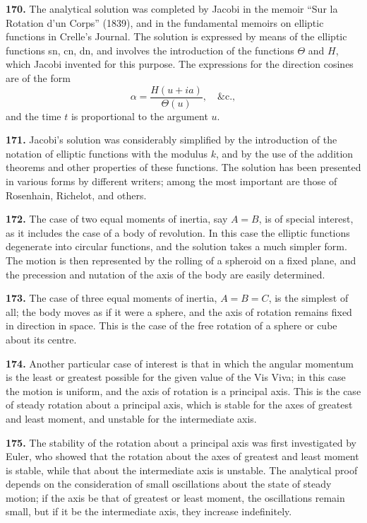 \documentclass[11pt,a4paper]{book}
\begin{document}
\textbf{170.} The analytical solution was completed by Jacobi in the memoir ``Sur la Rotation d'un Corps'' (1839), and in the fundamental memoirs on elliptic functions in Crelle's Journal. The solution is expressed by means of the elliptic functions sn, cn, dn, and involves the introduction of the functions $\Theta$ and $H$, which Jacobi invented for this purpose. The expressions for the direction cosines are of the form
\[
\alpha = \frac{H(u + ia)}{\Theta(u)}, \quad \&\text{c.},
\]
and the time $t$ is proportional to the argument $u$.

\textbf{171.} Jacobi's solution was considerably simplified by the introduction of the notation of elliptic functions with the modulus $k$, and by the use of the addition theorems and other properties of these functions. The solution has been presented in various forms by different writers; among the most important are those of Rosenhain, Richelot, and others.

\textbf{172.} The case of two equal moments of inertia, say $A = B$, is of special interest, as it includes the case of a body of revolution. In this case the elliptic functions degenerate into circular functions, and the solution takes a much simpler form. The motion is then represented by the rolling of a spheroid on a fixed plane, and the precession and nutation of the axis of the body are easily determined.

\textbf{173.} The case of three equal moments of inertia, $A = B = C$, is the simplest of all; the body moves as if it were a sphere, and the axis of rotation remains fixed in direction in space. This is the case of the free rotation of a sphere or cube about its centre.

\textbf{174.} Another particular case of interest is that in which the angular momentum is the least or greatest possible for the given value of the Vis Viva; in this case the motion is uniform, and the axis of rotation is a principal axis. This is the case of steady rotation about a principal axis, which is stable for the axes of greatest and least moment, and unstable for the intermediate axis.

\textbf{175.} The stability of the rotation about a principal axis was first investigated by Euler, who showed that the rotation about the axes of greatest and least moment is stable, while that about the intermediate axis is unstable. The analytical proof depends on the consideration of small oscillations about the state of steady motion; if the axis be that of greatest or least moment, the oscillations remain small, but if it be the intermediate axis, they increase indefinitely.
\end{document}
